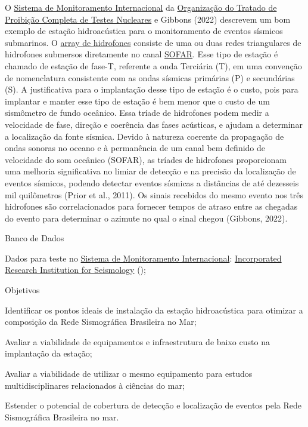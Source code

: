 \documentclass[10pt,a4paper,oneside]{book}
\begin{document}
O \href{https://www.ctbto.org/our-work/international-monitoring-system}{Sistema de Monitoramento Internacional} da \href{https://funag.gov.br/biblioteca/download/934-Tratado_de_Proibicao_Completa_dos_Testes_Nucleares_CTBT.pdf}{Organização do Tratado de Proibição Completa de Testes Nucleares} e Gibbons (2022) descrevem um bom exemplo de estação hidroacústica para o monitoramento de eventos sísmicos submarinos. O \href{https://www.ctbto.org/our-work/monitoring-technologies/hydroacoustic-monitoring}{array de hidrofones} consiste de uma ou duas redes triangulares de hidrofones submersos diretamente no canal \href{https://pt.wikipedia.org/wiki/Canal_SOFAR}{SOFAR}. Esse tipo de estação é chamado de estação de fase-T, referente a onda Terciária (T), em uma convenção de nomenclatura consistente com as ondas sísmicas primárias (P) e secundárias (S). A justificativa para o implantação desse tipo de estação é o custo, pois para implantar e manter esse tipo de estação é bem menor que o custo de um sismômetro de fundo oceânico. Essa tríade de hidrofones podem medir a velocidade de fase, direção e coerência das fases acústicas, e ajudam a determinar a localização da fonte sísmica. Devido à natureza coerente da propagação de ondas sonoras no oceano e à permanência de um canal bem definido de velocidade do som oceânico (SOFAR), as tríades de hidrofones proporcionam uma melhoria significativa no limiar de detecção e na precisão da localização de eventos sísmicos, podendo detectar eventos sísmicas a distâncias de até dezesseis mil quilômetros (Prior et al., 2011). Os sinais recebidos do mesmo evento nos três hidrofones são correlacionados para fornecer tempos de atraso entre as chegadas do evento para determinar o azimute no qual o sinal chegou (Gibbons, 2022).

\begin{fancyenum}{\faDatabase}{Banco de Dados}
	\item Dados para teste no \href{https://www.ctbto.org/our-work/international-monitoring-system}{Sistema de Monitoramento Internacional}: \href{https://ds.iris.edu/gmap/\#network=IM\&planet=earth}{Incorporated Research Institution for Seismology} (\faUnlock);
\end{fancyenum}

\begin{fancyenum}{\faFutbol}{Objetivos}
	\item Identificar os pontos ideais de instalação da estação hidroacústica para otimizar a composição da Rede Sismográfica Brasileira no Mar;
	\item Avaliar a viabilidade de equipamentos e infraestrutura de baixo custo na implantação da estação;
	\item Avaliar a viabilidade de utilizar o mesmo equipamento para estudos multidisciplinares relacionados à ciências do mar;
	\item Estender o potencial de cobertura de detecção e localização de eventos pela Rede Sismográfica Brasileira no mar.
\end{fancyenum}
\end{document}
